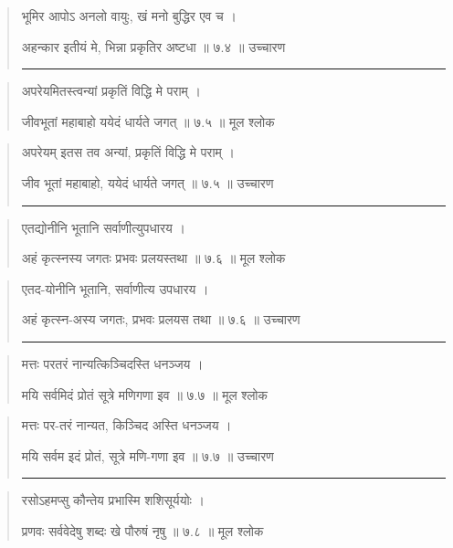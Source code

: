 \begin{quotation}
भूमिर आपोऽ अनलो वायुः, खं मनो बुद्धिर एव च  ।  

अहन्कार इतीयं मे, भिन्ना प्रकृतिर अष्टधा  ॥ ७.४ ॥  उच्चारण

\noindent\rule{16cm}{0.4pt} 
\end{quotation}


\begin{quotation} 
अपरेयमितस्त्वन्यां प्रकृतिं विद्धि मे पराम्‌  ।  

जीवभूतां महाबाहो ययेदं धार्यते जगत्‌  ॥ ७.५ ॥  मूल श्लोक
\end{quotation}

\begin{quotation}
अपरेयम् इतस तव अन्यां, प्रकृतिं विद्धि मे पराम्‌  ।  

जीव भूतां महाबाहो, ययेदं धार्यते जगत्‌  ॥ ७.५ ॥  उच्चारण

\noindent\rule{16cm}{0.4pt} 
\end{quotation}


\begin{quotation} 

एतद्योनीनि भूतानि सर्वाणीत्युपधारय  ।  

अहं कृत्स्नस्य जगतः प्रभवः प्रलयस्तथा  ॥ ७.६ ॥  मूल श्लोक
\end{quotation}

\begin{quotation}
एतद-योनीनि भूतानि, सर्वाणीत्य उपधारय  ।  

अहं कृत्स्न-अस्य जगतः, प्रभवः प्रलयस तथा  ॥ ७.६ ॥  उच्चारण

\noindent\rule{16cm}{0.4pt} 
\end{quotation}


\begin{quotation} 
मत्तः परतरं नान्यत्किञ्चिदस्ति धनञ्जय  ।  

मयि सर्वमिदं प्रोतं सूत्रे मणिगणा इव  ॥ ७.७ ॥  मूल श्लोक
\end{quotation}

\begin{quotation}
मत्तः पर-तरं नान्यत, किञ्चिद अस्ति धनञ्जय  ।  

मयि सर्वम इदं प्रोतं, सूत्रे मणि-गणा इव  ॥ ७.७ ॥  उच्चारण

\noindent\rule{16cm}{0.4pt} 
\end{quotation}


\begin{quotation} 
रसोऽहमप्सु कौन्तेय प्रभास्मि शशिसूर्ययोः  ।  

प्रणवः सर्ववेदेषु शब्दः खे पौरुषं नृषु  ॥ ७.८ ॥  मूल श्लोक
\end{quotation}

